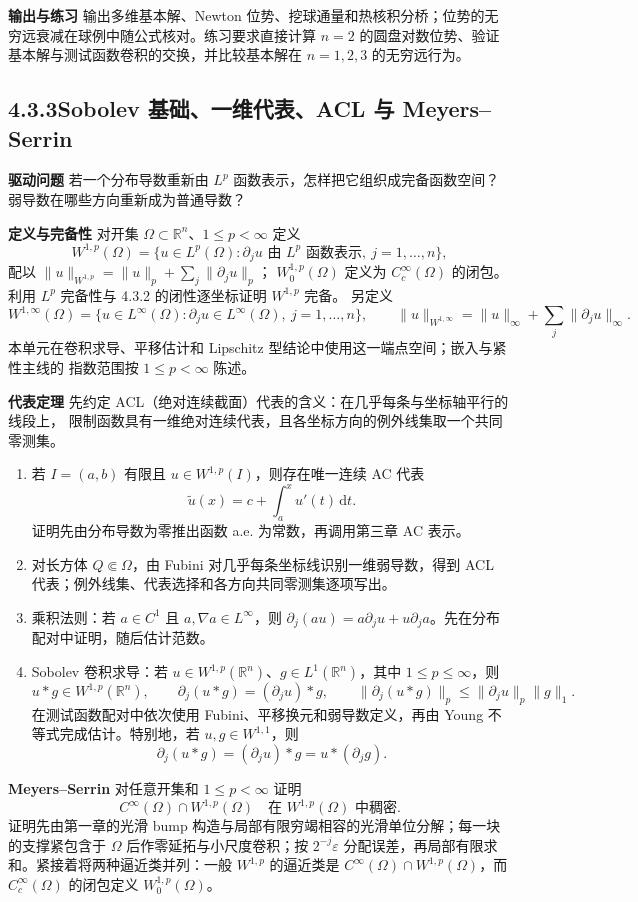 \documentclass[11pt,a4paper]{ctexart}
\newcommand{\R}{\mathbb R}
\newcommand{\eps}{\varepsilon}
\newcommand{\dd}{\,\mathrm d}
\newcommand{\planitem}[1]{\par\smallskip\noindent\textcolor{deepblue}{\textbf{#1}}\quad}
\newcommand{\unithead}[2]{\subsection{#1\quad #2}}
\begin{document}
\planitem{输出与练习}
输出多维基本解、Newton 位势、挖球通量和热核积分桥；位势的无穷远衰减在球例中随公式核对。练习要求直接计算 $n=2$ 的圆盘对数位势、验证基本解与测试函数卷积的交换，并比较基本解在 $n=1,2,3$ 的无穷远行为。

\unithead{4.3.3}{Sobolev 基础、一维代表、ACL 与 Meyers--Serrin}

\planitem{驱动问题}
若一个分布导数重新由 $L^p$ 函数表示，怎样把它组织成完备函数空间？弱导数在哪些方向重新成为普通导数？

\planitem{定义与完备性}
对开集 $\Omega\subset\R^n$、$1\le p<\infty$ 定义
\[
W^{1,p}(\Omega)=\{u\in L^p(\Omega):
\partial_ju\text{ 由 }L^p\text{ 函数表示},\ j=1,\ldots,n\},
\]
配以 $\|u\|_{W^{1,p}}=\|u\|_p+\sum_j\|\partial_ju\|_p$；
$W_0^{1,p}(\Omega)$ 定义为 $C_c^\infty(\Omega)$ 的闭包。利用 $L^p$ 完备性与 4.3.2 的闭性逐坐标证明 $W^{1,p}$ 完备。
另定义
\[
 W^{1,\infty}(\Omega)=\{u\in L^\infty(\Omega):\partial_ju\in L^\infty(\Omega),\ j=1,\ldots,n\},
 \qquad
 \|u\|_{W^{1,\infty}}=\|u\|_\infty+\sum_j\|\partial_ju\|_\infty.
\]
本单元在卷积求导、平移估计和 Lipschitz 型结论中使用这一端点空间；嵌入与紧性主线的
指数范围按 $1\le p<\infty$ 陈述。

\planitem{代表定理}
先约定 ACL（绝对连续截面）代表的含义：在几乎每条与坐标轴平行的线段上，
限制函数具有一维绝对连续代表，且各坐标方向的例外线集取一个共同零测集。
\begin{enumerate}
\item 若 $I=(a,b)$ 有限且 $u\in W^{1,p}(I)$，则存在唯一连续 AC 代表
\[
\widetilde u(x)=c+\int_a^xu'(t)\dd t.
\]
证明先由分布导数为零推出函数 a.e. 为常数，再调用第三章 AC 表示。
\item 对长方体 $Q\Subset\Omega$，由 Fubini 对几乎每条坐标线识别一维弱导数，得到 ACL 代表；例外线集、代表选择和各方向共同零测集逐项写出。
\item 乘积法则：若 $a\in C^1$ 且 $a,\nabla a\in L^\infty$，则
$\partial_j(au)=a\partial_ju+u\partial_ja$。先在分布配对中证明，随后估计范数。
\item Sobolev 卷积求导：若 $u\in W^{1,p}(\R^n)$、$g\in L^1(\R^n)$，其中 $1\le p\le\infty$，则
\[
u*g\in W^{1,p}(\R^n),\qquad
\partial_j(u*g)=(\partial_ju)*g,
\qquad
\|\partial_j(u*g)\|_p
\le\|\partial_ju\|_p\|g\|_1.
\]
在测试函数配对中依次使用 Fubini、平移换元和弱导数定义，再由 Young 不等式完成估计。特别地，若 $u,g\in W^{1,1}$，则
\[
\partial_j(u*g)=(\partial_ju)*g=u*(\partial_jg).
\]
\end{enumerate}

\planitem{Meyers--Serrin}
对任意开集和 $1\le p<\infty$ 证明
\[
C^\infty(\Omega)\cap W^{1,p}(\Omega)
\quad\text{在 }W^{1,p}(\Omega)\text{ 中稠密}.
\]
证明先由第一章的光滑 bump 构造与局部有限穷竭相容的光滑单位分解；每一块的支撑紧包含于 $\Omega$ 后作零延拓与小尺度卷积；按 $2^{-j}\eps$ 分配误差，再局部有限求和。紧接着将两种逼近类并列：一般 $W^{1,p}$ 的逼近类是 $C^\infty(\Omega)\cap W^{1,p}(\Omega)$，而 $C_c^\infty(\Omega)$ 的闭包定义 $W_0^{1,p}(\Omega)$。
\end{document}
